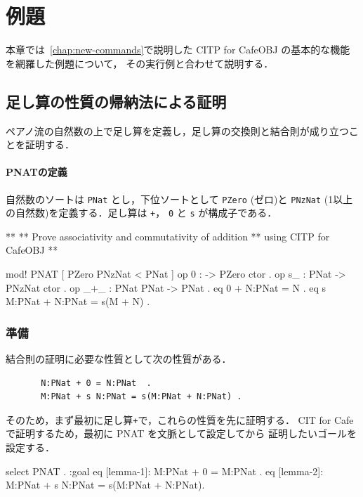 \documentclass[a4paper,oneside,10pt,here]{memoir}
\newenvironment{vvtm}%
{\parskip=0pt\lineskip=0pt\begin{center}\begin{minipage}{0.8\textwidth}\begin{snugshade}}%
  {\end{snugshade}\end{minipage}\end{center}}
\begin{document}
\chapter{例題}
\label{chap:prototype}

本章では~\ref{chap:new-commands}で説明した CITP for CafeOBJ の基本的な機能を網羅した例題について，
その実行例と合わせて説明する．

\section{足し算の性質の帰納法による証明}
\label{sec:pnat}
ペアノ流の自然数の上で足し算を定義し，足し算の交換則と結合則が成り立つことを証明する．

\subsubsection{PNATの定義}
自然数のソートは \texttt{PNat} とし，下位ソートとして \texttt{PZero} (ゼロ)と
\texttt{PNzNat} (1以上の自然数)を定義する．足し算は \texttt{+}，
\texttt{0} と \texttt{s} が構成子である．
\begin{vvtm}
\begin{simplev}
**
** Prove associativity and commutativity of addition
** using CITP for CafeOBJ
**

mod! PNAT {
  [ PZero PNzNat < PNat ]
  op 0 : -> PZero {ctor} .
  op s_ : PNat -> PNzNat {ctor} .
  op _+_ : PNat PNat -> PNat .
  eq 0 + N:PNat = N .
  eq s M:PNat + N:PNat = s(M + N) .
}
\end{simplev}
\end{vvtm}

\subsection{準備}

結合則の証明に必要な性質として次の性質がある．

\begin{verbatim}
       N:PNat + 0 = N:PNat  .
       M:PNat + s N:PNat = s(M:PNat + N:PNat) .
\end{verbatim}

そのため，まず最初に足し算\texttt{+}で，これらの性質を先に証明する．
CIT for Cafe で証明するため，最初に PNAT を文脈として設定してから
証明したいゴールを設定する．

\begin{vvtm}
\begin{simplev}
select PNAT .
:goal { eq [lemma-1]: M:PNat + 0 = M:PNat .
        eq [lemma-2]: M:PNat + s N:PNat = s(M:PNat + N:PNat). }
\end{simplev}
\end{vvtm}
\end{document}
